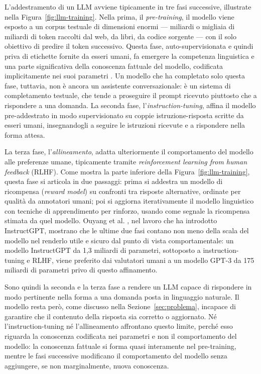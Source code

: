 L'addestramento di un LLM avviene tipicamente in tre fasi successive, illustrate nella Figura~\ref{fig:llm-training}. Nella prima, il \emph{pre-training}, il modello
viene esposto a un corpus testuale di dimensioni enormi --- miliardi o migliaia di miliardi di token raccolti dal web, da libri, da codice sorgente --- con il solo obiettivo di predire il token successivo. Questa fase, auto-supervisionata e quindi priva di etichette fornite da esseri umani, fa emergere la competenza linguistica e una parte significativa della conoscenza fattuale del modello, codificata implicitamente nei suoi parametri \cite{zhao2023survey}.
Un modello che ha completato solo questa fase, tuttavia, non è ancora un assistente conversazionale: è un sistema di completamento testuale, che tende a proseguire il prompt ricevuto piuttosto che a rispondere a una domanda. La seconda fase, l'\emph{instruction-tuning}, affina il modello pre-addestrato in modo supervisionato su coppie istruzione-risposta scritte da esseri umani, insegnandogli a seguire le istruzioni ricevute e a rispondere nella forma attesa.

La terza fase, l'\emph{allineamento}, adatta ulteriormente il comportamento del modello alle preferenze umane, tipicamente tramite \emph{reinforcement learning from human feedback} (RLHF). Come mostra la parte inferiore della Figura~\ref{fig:llm-training}, questa fase si articola in due passaggi: prima si addestra un modello di ricompensa (\emph{reward model}) su confronti tra risposte alternative, ordinate per qualità da annotatori umani; poi si aggiorna iterativamente il modello linguistico con tecniche di apprendimento per rinforzo, usando come segnale la ricompensa stimata da quel modello. Ouyang et al. \cite{ouyang2022instructgpt}, nel lavoro che ha introdotto InstructGPT, mostrano che le ultime due fasi contano non meno della scala del modello nel renderlo utile e sicuro dal punto di vista comportamentale: un modello InstructGPT da 1,3 miliardi di parametri, sottoposto a instruction-tuning e RLHF, viene preferito dai valutatori umani a un modello GPT-3 da 175 miliardi di parametri privo di questo affinamento.

Sono quindi la seconda e la terza fase a rendere un LLM capace di rispondere in modo pertinente nella forma a una domanda posta in linguaggio naturale. Il modello resta però, come discusso nella Sezione~\ref{sec:problema}, incapace di garantire che il contenuto della risposta sia corretto o aggiornato. Né l'instruction-tuning né l'allineamento affrontano questo limite, perché esso riguarda la conoscenza codificata nei parametri e non il comportamento del modello: la conoscenza fattuale si forma quasi interamente nel pre-training, mentre le fasi successive modificano il comportamento del modello senza aggiungere, se non marginalmente, nuova conoscenza.

